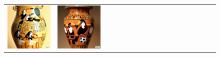 \begin{figure}[ht!]
\begin{adjustwidth}{-0.8in}{-0.5in}
\begin{tabular}{cccccccccccccccccccc}
\multicolumn{2}{c}{\includegraphics[width=\threebythreecolwidth\textwidth]{figures/cherries/toucan_tennis.jpg}} &
\multicolumn{2}{c}{\includegraphics[width=\threebythreecolwidth\textwidth]{figures/cherries/toucan_soccer.jpg}} &

\end{tabular}
\end{adjustwidth}
\end{figure}

